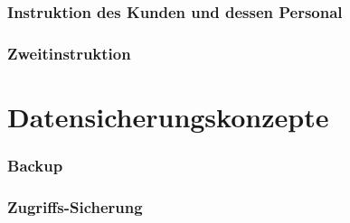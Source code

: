 \documentclass[paper=a4,BCOR8.25mm,twoside]{scrartcl}
\begin{document}
\section{Instruktion des Kunden und dessen Personal}

\section{Zweitinstruktion}

\part{Datensicherungskonzepte}
\section{Backup}
\label{backup}

\section{Zugriffs-Sicherung}
\label{security}
\end{document}
